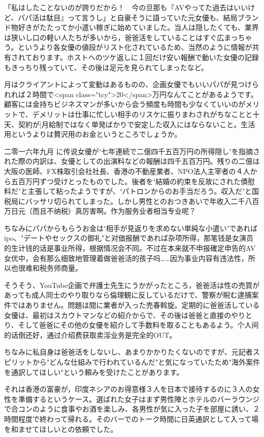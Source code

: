 \documentclass[12pt,UTF8]{ctexbook}
\begin{document}
「私はしたことないのが誇りだから！　今の旦那も『AVやってた過去はいいけど、パパ活は駄目』って言うし」と自豪そうに語っていた元女優も、結局ブランド物好きがたたってか小遣い稼ぎに始めていました。当人は隠したくても、業界は狭いし口の軽い人たちが多いから，爸爸活をしていることはすぐ広まっちゃう。というより各女優の値段がリスト化されているため、当然のように情報が共有されております。ホストへのツケ返しに１回だけ安い報酬で動いた女優の記録もきっちり残っていて、その後は足元を見られてしまったなど。

月はクライアントによって変動はあるものの、企画女優でもいいパパが見つけられれば２時間で<span class="tcy">20</span>万円なんてことがあるようです。顧客には金持ちビジネスマンが多いから会う頻度も時間も少なくていいのがメリットで、デメリットは仕事に忙しい相手のリスケに振りまわされがちなことと十天、契約が|月給制ではなく単発ばかりで安定した収入にはならないこと。生活用というよりは贅沢用のお金というところでしょうか。

二零一六年九月 に传说女優がʻ七年連続で二億四千五百万円の所得隠しʼを指摘された際の内訳は、女優としての出演料などの報酬は四千五百万円。残りの二億は大阪の医師、FX株取引会社社長、香港の不動産業者、NPO法人主宰者の４人から五百万円ずつ受けとったものでした。後者をʻ結婚の約束を反故にされた債慰料だʼと主張して粘ったようですが、ʻパトロンからのお手当だろう。収入だʼと国税局にバッサリ切られてしまった。しかし男性とのおつきあいで年收入二千八百万日元（而且不纳税）真厉害啊。作为服务业者相当专业呢？

ちなみにパパからもらうお金はʻ相手が見返りを求めない単純な小遣いʼであればipo、"デートやセックスの御礼"と对価报酬であれば杂项所得，那笔钱是女演员的生计钱的话是事业所得，根据情况会不同。不过在本来就不申报確定申告的AV女优中，会有那么细致地管理着做爸爸活的孩子吗……因为事业内容有违法性，所以也很难和税务师商量。

そうそう、YouTube企画で弁護士先生にうかがったところ，爸爸活は性の売買があっても成人同士のやり取りなら倫理観に反しているだけで、警察が睨む逮捕案件ではありません。問題は間に業者が入った売春斡旋。定期的に爸爸活している女優は、最初はスカウトマンなどの紹介からで、その後は爸爸と直接のやりとり、そして爸爸にその他の女優を紹介して手数料を取ることもあるよう。个人间的话倒还好，通过介绍费获取卖淫业务是完全的OUT。

ちなみに私自身は爸爸活をしないし、あまりかかりたくないのですが、元記者スピリットから"どんな仕組みで行われているんだ"と気になっていたため"海外案件を通訳してほしい"という頼みを受けたことがあります。

それは香港の富豪が，印度ネシアのお得意様３人を日本で接待するのに３人の女性を準備するというケース。選ばれた女子はまず男性陣とホテルのバーラウンジで合コンのように食事やお酒を楽しみ、各男性が気に入った子を部屋に誘い、２時間程度で終わって帰れる。そのバーでのトーク時間に日英通訳として入って場を和ませてほしいとの依頼でした。
\end{document}
